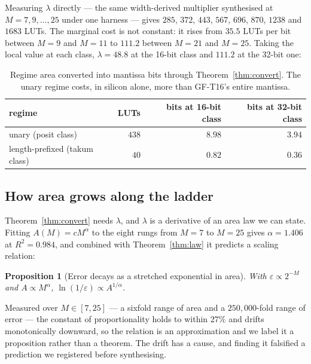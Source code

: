 \documentclass[11pt]{article}
\newtheorem{proposition}[theorem]{Proposition}
\theoremstyle{definition}
\begin{document}
Measuring $\lambda$ directly --- the same width-derived multiplier synthesised at
$M = 7, 9, \ldots, 25$ under one harness --- gives $285$, $372$, $443$, $567$,
$696$, $870$, $1238$ and $1683$ LUTs. The marginal cost is not constant: it rises
from $35.5$ LUTs per bit between $M{=}9$ and $M{=}11$ to $111.2$ between $M{=}21$
and $M{=}25$. Taking the local value at each class, $\lambda = 48.8$ at the
16-bit class and $111.2$ at the 32-bit one:

\begin{table}[t]\centering
\caption{Regime area converted into mantissa bits through
Theorem~\ref{thm:convert}. The unary regime costs, in silicon alone, more than
GF-T16's entire mantissa.}
\label{tab:convert}
\begin{tabular}{lrrr}
\toprule
regime & LUTs & bits at 16-bit class & bits at 32-bit class \\
\midrule
unary (posit class)          & $438$ & $\mathbf{8.98}$ & $3.94$ \\
length-prefixed (takum class) & $40$  & $0.82$ & $0.36$ \\
\bottomrule
\end{tabular}
\end{table}


\subsection{How area grows along the ladder}\label{sec:arealaw}

Theorem~\ref{thm:convert} needs $\lambda$, and $\lambda$ is a derivative of an
area law we can state. Fitting $A(M) = cM^{\alpha}$ to the eight rungs from
$M{=}7$ to $M{=}25$ gives $\alpha = 1.406$ at $R^2 = 0.984$, and combined with
Theorem~\ref{thm:law} it predicts a scaling relation:

\begin{proposition}[Error decays as a stretched exponential in area]
\label{prop:stretched}
With $\varepsilon \propto 2^{-M}$ and $A \propto M^{\alpha}$,
$\ln(1/\varepsilon) \propto A^{1/\alpha}$.
\end{proposition}

Measured over $M \in [7,25]$ --- a sixfold range of area and a $250{,}000$-fold
range of error --- the constant of proportionality holds to within $27\%$ and
drifts monotonically downward, so the relation is an approximation and we label
it a proposition rather than a theorem. The drift has a cause, and finding it
falsified a prediction we registered before synthesising.
\end{document}
